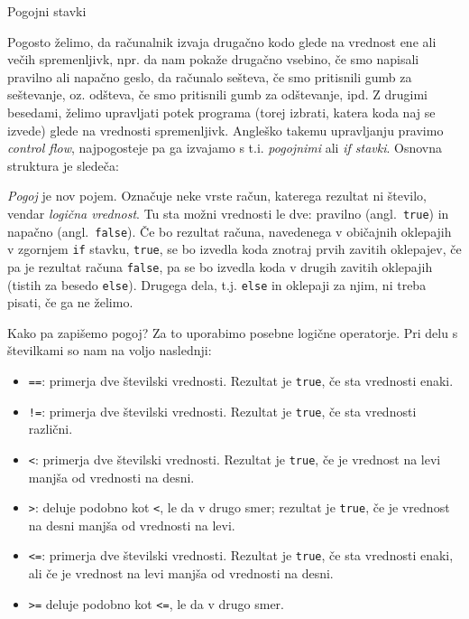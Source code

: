 
Pogojni stavki


Pogosto želimo, da računalnik izvaja drugačno kodo glede na vrednost ene ali
večih spremenljivk, npr. da nam pokaže drugačno vsebino, če smo napisali
pravilno ali napačno geslo, da računalo sešteva, če smo pritisnili gumb za
seštevanje, oz. odšteva, če smo pritisnili gumb za odštevanje, ipd. Z drugimi
besedami, želimo upravljati potek programa (torej izbrati, katera koda naj
se izvede) glede na vrednosti spremenljivk. Angleško takemu upravljanju
pravimo \emph{control flow}, najpogosteje pa ga izvajamo s t.i. \emph{pogojnimi}
ali \emph{if stavki}. Osnovna struktura je sledeča:

\begin{examples}


\end{examples}

\emph{Pogoj} je nov pojem. Označuje neke vrste račun, katerega rezultat ni
število, vendar \emph{logična vrednost}. Tu sta možni vrednosti le dve:
pravilno (angl.~\verb+true+) in napačno (angl.~\verb+false+). Če bo rezultat
računa, navedenega v običajnih oklepajih v zgornjem \verb+if+ stavku,
\verb+true+,
se bo izvedla koda znotraj prvih zavitih oklepajev, če pa je rezultat računa
\verb+false+, pa se bo izvedla koda v drugih zavitih oklepajih (tistih za besedo
\verb+else+). Drugega dela, t.j. \verb+else+ in oklepaji za njim, ni treba
pisati, če ga ne želimo.

Kako pa zapišemo pogoj? Za to uporabimo posebne logične operatorje. Pri delu s
številkami so nam na voljo naslednji:
\begin{itemize}
  \item \verb+==+: primerja dve številski vrednosti.
	Rezultat je \verb+true+, če sta vrednosti enaki.
  \item \verb+!=+: primerja dve številski vrednosti.
	Rezultat je \verb+true+, če sta vrednosti različni.
  \item \verb+<+: primerja dve številski vrednosti.
	Rezultat je \verb+true+, če je vrednost na levi manjša od vrednosti na desni.
  \item \verb+>+: deluje podobno kot \verb+<+, le da v drugo smer;
	rezultat je \verb+true+, če je vrednost na desni manjša od vrednosti na levi.
  \item \verb+<=+: primerja dve številski vrednosti.
	Rezultat je \verb+true+, če sta vrednosti enaki, ali če je vrednost
	na levi manjša od vrednosti na desni.
  \item \verb+>=+ deluje podobno kot \verb+<=+, le da v drugo smer.
\end{itemize}

